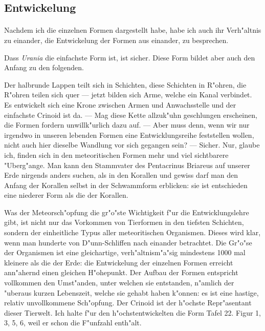 \documentclass[a4paper, 11pt, oneside]{article}
\begin{document}
\subsection{Entwickelung}
\paragraph{}
Nachdem ich die einzelnen Formen dargestellt habe, habe ich auch ihr Verh"altnis zu einander, die Entwickelung der Formen aus einander, zu besprechen.

Dass \emph{Urania} die einfachste Form ist, ist sicher. Diese Form bildet aber auch den Anfang zu den folgenden.

Der halbrunde Lappen teilt sich in Schichten, diese Schichten in R"ohren, die R"ohren teilen sich quer --- jetzt bilden sich Arme, welche ein Kanal verbindet. Es entwickelt sich eine Krone zwischen Armen und Anwachsstelle und der einfachste Crinoid ist da. --- Mag diese Kette allzuk"uhn geschlungen erscheinen, die Formen fordern unwillk"urlich dazu auf. --- Aber muss denn, wenn wir nur irgendwo in unseren lebenden Formen eine Entwicklungsreihe feststellen wollen, nicht auch hier dieselbe Wandlung vor sich gegangen sein? --- Sicher. Nur, glaube ich, finden sich in den meteoritischen Formen mehr und viel sichtbarere "Uberg"ange. Man kann den Stammvater des Pentacrinus Briareus auf unserer Erde nirgends anders suchen, als in den Korallen und gewiss darf man den Anfang der Korallen selbst in der Schwammform erblicken: sie ist entschieden eine niederer Form als die der Korallen.

Was der Meteorsch"opfung die gr"o"ste Wichtigkeit f"ur die Entwicklungslehre gibt, ist nicht nur das Vorkommen von Tierformen in den tiefsten Schichten, sondern der einheitliche Typus aller meteoritischen Organismen. Dieses wird klar, wenn man hunderte von D"unn-Schliffen nach einander betrachtet. Die Gr"o"se der Organismen ist eine gleichartige, verh"altnism"a"sig mindestens 1000 mal kleinere als die der Erde: die Entwickelung der einzelnen Formen erreicht ann"ahernd einen gleichen H"ohepunkt. Der Aufbau der Formen entspricht vollkommen den Umst"anden, unter welchen sie entstanden, n"amlich der "uberaus kurzen Lebenszeit, welche sie gehabt haben k"onnen: es ist eine hastige, relativ unvollkommene Sch"opfung. Der Crinoid ist der h"ochste Repr"asentant dieser Tierwelt. Ich halte f"ur den h"ochstentwickelten die Form Tafel 22. Figur 1, 3, 5, 6, weil er schon die F"unfzahl enth"alt.
\end{document}
